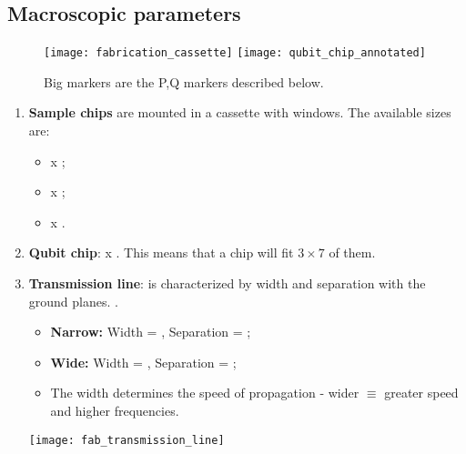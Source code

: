 \subsection{Macroscopic parameters}\label{sec:size-parameters}
\begin{figure}[ht]
  \centering         \texttt{[image: fabrication\_cassette]}
  \texttt{[image: qubit\_chip\_annotated]}
  \caption{\small   Big  markers   are   the   P,Q  markers   described
    below.\label{fig:qubit_chip}}
\end{figure}
\begin{enumerate}
\item \textbf{Sample chips} are mounted in a cassette with windows. The
  available sizes are:

  \begin{itemize}
  \item {} x ;
  \item {} x ;
  \item {} x .
  \end{itemize}

  \noindent {}

\item \textbf{Qubit  chip}:  x .   This means
  that a  chip will fit $ 3\times7 $ of them.

\item  \textbf{Transmission  line}:  is   characterized  by  width  and
  separation  with the  ground planes.   .

  \begin{itemize}
  \item  \textbf{Narrow:}  Width  =  ,  Separation  =
    ;
  \item  \textbf{Wide:}   Width  =  ,   Separation  =
    ;
  \item  The  width  determines  the   speed  of  propagation  -  wider
    $ \equiv $ greater speed and higher frequencies.
  \end{itemize}

  \begin{center}
    \texttt{[image: fab\_transmission\_line]}
  \end{center}
\end{enumerate}


